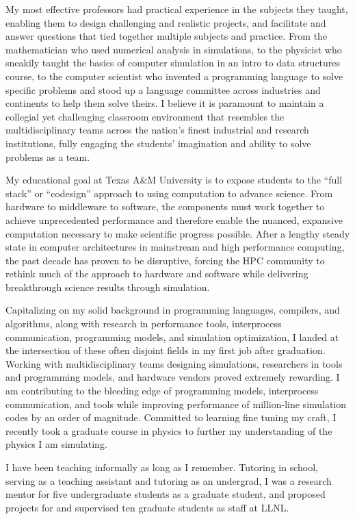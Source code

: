 \documentclass[11pt]{article}
\begin{document}
My most effective professors had practical experience in the subjects they taught, enabling them to design challenging and realistic projects, and facilitate and answer questions that tied together multiple subjects and practice.  From the mathematician who used numerical analysis in simulations, to the physicist who sneakily taught the basics of computer simulation in an intro to data structures course, to the computer scientist who invented a programming language to solve specific problems and stood up a language committee across industries and continents to help them solve theirs.  I believe it is paramount to maintain a collegial yet challenging classroom environment that resembles the multidisciplinary teams across the nation's finest industrial and research institutions, fully engaging the students' imagination and ability to solve problems as a team.

My educational goal at Texas A\&M University is to expose students to the ``full stack'' or ``codesign'' approach to using computation to advance science.  From hardware to middleware to software, the components must work together to achieve unprecedented performance and therefore enable the nuanced, expansive computation necessary to make scientific progress possible.  After a lengthy steady state in computer architectures in mainstream and high performance computing, the past decade has proven to be disruptive, forcing the HPC community to rethink much of the approach to hardware and software while delivering breakthrough science results through simulation.

Capitalizing on my solid background in programming languages, compilers, and algorithms, along with research in performance tools, interprocess communication, programming models, and simulation optimization,
I landed at the intersection of these often disjoint fields in my first job after graduation.  Working with multidisciplinary teams designing simulations, researchers in tools and programming models,
and hardware vendors proved extremely rewarding.  I am contributing to the bleeding edge of programming models, interprocess communication, and tools while improving
performance of million-line simulation codes by an order of magnitude.  Committed to learning fine tuning my craft, I recently took a graduate course in physics to further my understanding
of the physics I am simulating.

I have been teaching informally as long as I remember.  Tutoring in school, serving as a teaching assistant and tutoring as an undergrad,
I was a research mentor for five undergraduate students as a graduate student, and proposed projects for and supervised ten graduate students as staff at LLNL.
\end{document}
